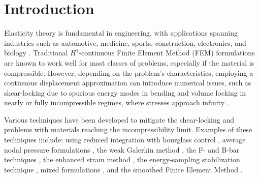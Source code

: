 \documentclass[english,11pt,3p,number,sort&compress]{elsarticle}
\begin{document}
\begin{frontmatter}{}
\end{frontmatter}{}

\section{Introduction}

Elasticity theory is fundamental in engineering, with applications spanning industries such as automotive, medicine, sports, construction, electronics, and biology \cite{banks2011brief, li2021topological, naddeo2021degradable, ferrari2022effect, sanfilippo2024revolutionising, mousavi2022experimental, weakley2022putting, mashaly2011evaluation, semnani2011advances, gosling2013analysis, edlund2009model, pan2023research, tian2024elastic, santos2025self, leonardi2024deeper}. Traditional  $H^1$-continuous Finite Element Method (FEM) formulations are known to work well for most classes of problems, especially if the material is compressible. However, depending on the problem's characteristics, employing a continuous displacement approximation can introduce numerical issues, such as shear-locking due to spurious energy modes in bending \cite{bletzinger2000unified,belytschko1985stress} and volume locking in nearly or fully incompressible regimes, where stresses approach infinity \cite{neto2005f,cervera2003mixed}.

Various techniques have been developed to mitigate the shear-locking and problems with materials reaching the incompressibility limit. Examples of these techniques include: using reduced integration with hourglass control \cite{koh1987new, hutter2000total}, average nodal pressure formulations \cite{bonet1998simple, andrade2004assessment}, the weak Galerkin method \cite{lin2018weak,wang2024lowest,harper2019lowest}, the F- and B-bar techniques \cite{de1996design, neto2005f}, the enhanced strain method \cite{lovadina2003enhanced, de1995remarks}, the energy-sampling stabilization technique \cite{sivapuram2019energy, pakravan2017mean}, mixed formulations \cite{brezzi2012mixed,arnold1988new,taylor1973numerical}, and the smoothed Finite Element Method \cite{lee2020linear, jiang2018sharp}. 

\end{document}
